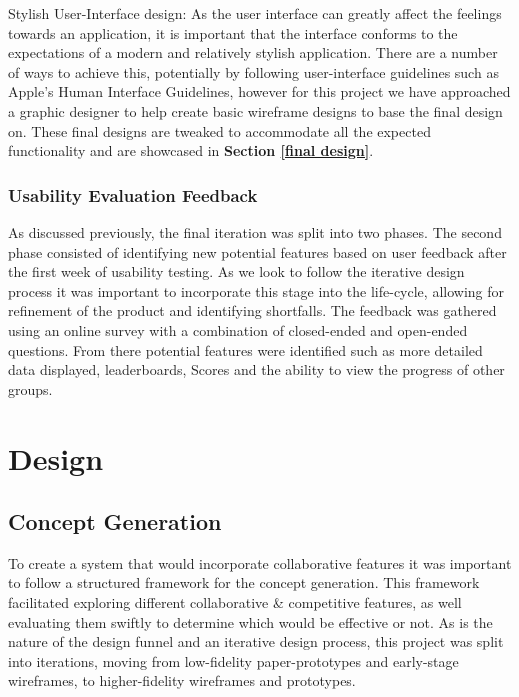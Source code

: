 \documentclass{l4proj}
\begin{document}
Stylish User-Interface design: As the user interface can greatly affect the feelings towards an application, it is important that the interface conforms to the expectations of a modern and relatively stylish application. There are a number of ways to achieve this, potentially by following user-interface guidelines such as Apple's Human Interface Guidelines, however for this project we have approached a graphic designer to help create basic wireframe designs to base the final design on. These final designs are tweaked to accommodate all the expected functionality and are showcased in \textbf{Section \ref{final design}}. 

\subsection{Usability Evaluation Feedback} \label{usabilityevaluationfeedback}

As discussed previously, the final iteration was split into two phases. The second phase consisted of identifying new potential features based on user feedback after the first week of usability testing. As we look to follow the iterative design process it was important to incorporate this stage into the life-cycle, allowing for refinement of the product and identifying shortfalls. The feedback was gathered using an online survey with a combination of closed-ended and open-ended questions. From there potential features were identified such as more detailed data displayed, leaderboards, Scores and the ability to view the progress of other groups. 




\chapter{Design}


\section{Concept Generation} \label{conceptGeneration}

To create a system that would incorporate collaborative features it was important to follow a structured framework for the concept generation. This framework facilitated exploring different collaborative \& competitive features, as well evaluating them swiftly to determine which would be effective or not. As is the nature of the design funnel and an iterative design process, this project was split into iterations, moving from low-fidelity paper-prototypes and early-stage wireframes, to higher-fidelity wireframes and prototypes. 
\end{document}
